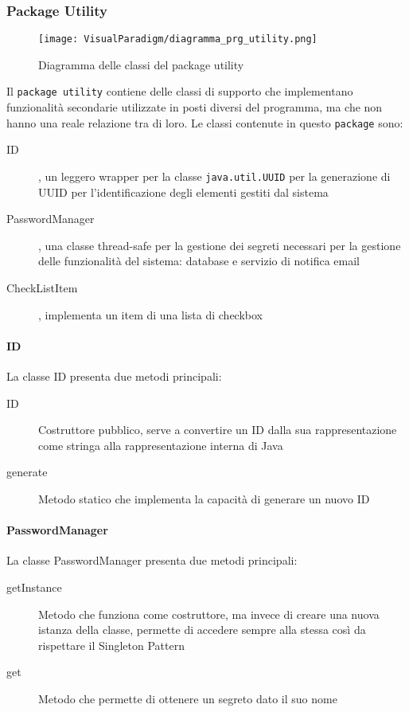 
\subsubsection{Package Utility}
\label{sec:prg_utility}
\begin{figure}[H]
  \centering
  \texttt{[image: VisualParadigm/diagramma\_prg\_utility.png]}
  \caption{Diagramma delle classi del package utility}
  \label{fig:prg_utility}
\end{figure}

Il \texttt{package utility} contiene delle classi di supporto che
implementano funzionalità secondarie utilizzate in posti diversi del
programma, ma che non hanno una reale relazione tra di loro.
Le classi contenute in questo \texttt{package} sono:
\begin{description}
\item[ID], un leggero wrapper per la classe \texttt{java.util.UUID}
  per la generazione di UUID per l'identificazione degli elementi
  gestiti dal sistema
\item[PasswordManager], una classe thread-safe per la gestione dei
  segreti necessari per la gestione delle funzionalità del sistema:
  database e servizio di notifica email
\item[CheckListItem], implementa un item di una lista di checkbox
\end{description}

\paragraph{ID}
La classe ID presenta due metodi principali:
\begin{description}
\item[ID] Costruttore pubblico, serve a convertire un ID dalla sua rappresentazione come stringa alla rappresentazione interna di Java
\item[generate] Metodo statico che implementa la capacità di generare
  un nuovo ID
\end{description}

\paragraph{PasswordManager}
La classe PasswordManager presenta due metodi principali:
\begin{description}
\item[getInstance] Metodo che funziona come costruttore, ma invece di
  creare una nuova istanza della classe, permette di accedere sempre
  alla stessa così da rispettare il Singleton Pattern
\item[get] Metodo che permette di ottenere un segreto dato il suo nome
\end{description}

